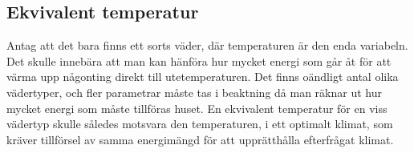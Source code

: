 \subsection{Ekvivalent temperatur}
Antag att det bara finns ett sorts väder, där temperaturen är den enda variabeln. Det skulle innebära att man kan hänföra hur mycket energi som går åt för att värma upp någonting direkt till utetemperaturen. Det finns oändligt antal olika vädertyper, och fler parametrar måste tas i beaktning då man räknar ut hur mycket energi som måste tillföras huset. En ekvivalent temperatur för en viss vädertyp skulle således motsvara den temperaturen, i ett optimalt klimat, som kräver tillförsel av samma energimängd för att upprätthålla efterfrågat klimat.

